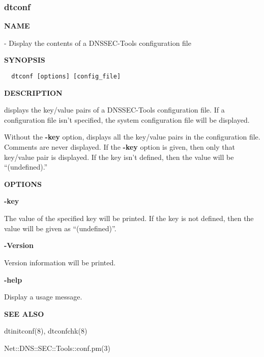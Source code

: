 \clearpage

\subsubsection{dtconf}

{\bf NAME}

 - Display the contents of a DNSSEC-Tools configuration file

{\bf SYNOPSIS}

\begin{verbatim}
  dtconf [options] [config_file]
\end{verbatim}

{\bf DESCRIPTION}

 displays the key/value pairs of a DNSSEC-Tools configuration
file.  If a configuration file isn't specified, the system configuration
file will be displayed.

Without the {\bf -key} option,  displays all the key/value pairs
in the configuration file.  Comments are never displayed.  If the {\bf -key}
option is given, then only that key/value pair is displayed.  If the key isn't
defined, then the value will be ``(undefined).''

{\bf OPTIONS}

\begin{description}

\item {\bf -key}\verb" "

The value of the specified key will be printed.  If the key is not defined,
then the value will be given as ``(undefined)''.

\item {\bf -Version}\verb" "

Version information will be printed.

\item {\bf -help}\verb" "

Display a usage message.

\end{description}

{\bf SEE ALSO}

dtinitconf(8),
dtconfchk(8)

Net::DNS::SEC::Tools::conf.pm(3)

